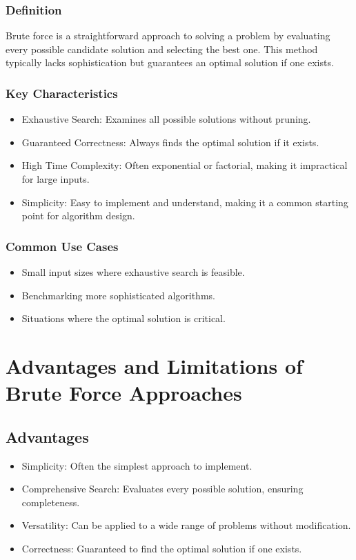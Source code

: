 \documentclass[12pt]{article}
\begin{document}
    \subsubsection{Definition}
    Brute force is a straightforward approach to solving a problem by evaluating every possible candidate solution and selecting the best one. This method typically lacks sophistication but guarantees an optimal solution if one exists.

    \subsubsection{Key Characteristics}
        \begin{itemize}
            \item Exhaustive Search: Examines all possible solutions without pruning.
            \item Guaranteed Correctness: Always finds the optimal solution if it exists.
            \item High Time Complexity: Often exponential or factorial, making it impractical for large inputs.
            \item Simplicity: Easy to implement and understand, making it a common starting point for algorithm design.
        \end{itemize}

    \subsubsection{Common Use Cases}
        \begin{itemize}
            \item Small input sizes where exhaustive search is feasible.
            \item Benchmarking more sophisticated algorithms.
            \item Situations where the optimal solution is critical.
        \end{itemize}

    \section{Advantages and Limitations of Brute Force Approaches}

    \subsection{Advantages}
        \begin{itemize}
            \item Simplicity: Often the simplest approach to implement.
            \item Comprehensive Search: Evaluates every possible solution, ensuring completeness.
            \item Versatility: Can be applied to a wide range of problems without modification.
            \item Correctness: Guaranteed to find the optimal solution if one exists.
        \end{itemize}
\end{document}
